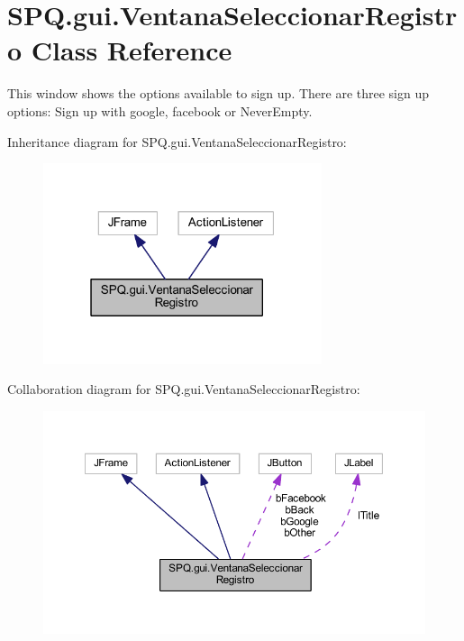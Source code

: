 \hypertarget{class_s_p_q_1_1gui_1_1_ventana_seleccionar_registro}{}\section{S\+P\+Q.\+gui.\+Ventana\+Seleccionar\+Registro Class Reference}
\label{class_s_p_q_1_1gui_1_1_ventana_seleccionar_registro}


This window shows the options available to sign up. There are three sign up options\+: Sign up with google, facebook or Never\+Empty.  




Inheritance diagram for S\+P\+Q.\+gui.\+Ventana\+Seleccionar\+Registro\+:
\nopagebreak
\begin{figure}[H]
\begin{center}
\leavevmode
\includegraphics[width=232pt]{class_s_p_q_1_1gui_1_1_ventana_seleccionar_registro__inherit__graph}
\end{center}
\end{figure}


Collaboration diagram for S\+P\+Q.\+gui.\+Ventana\+Seleccionar\+Registro\+:
\nopagebreak
\begin{figure}[H]
\begin{center}
\leavevmode
\includegraphics[width=350pt]{class_s_p_q_1_1gui_1_1_ventana_seleccionar_registro__coll__graph}
\end{center}
\end{figure}
